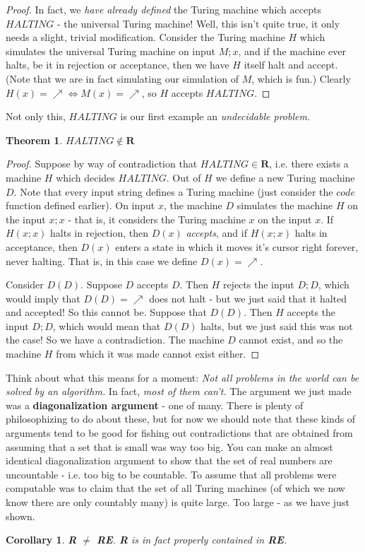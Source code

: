 \documentclass{article}
\theoremstyle{definition}
\theoremstyle{plain}
\theoremstyle{theorem}
\newtheorem{theorem}{Theorem}[section]
\newtheorem{corollary}{Corollary}[section]
\begin{document}
\begin{proof}
    In fact, we \textit{have already defined } the Turing machine which accepts $HALTING$ - the universal Turing machine! Well, this isn't quite true, it only needs a slight, trivial modification. Consider the Turing machine $H$ which simulates the universal Turing machine on input $M;x$, and if the machine ever halts, be it in rejection or acceptance, then we have $H$ itself halt and accept. (Note that we are in fact simulating our simulation of $M$, which is fun.) Clearly $H(x) = \nearrow \iff M(x) = \nearrow$, so $H$ accepts $HALTING$.
\end{proof}
Not only this, $HALTING$ is our first example an \textit{undecidable problem}. 
\begin{theorem}
    $HALTING \notin \textbf{R}$
\end{theorem}
\begin{proof}
    Suppose by way of contradiction that $HALTING \in \textbf{R}$, i.e. there exists a machine $H$ which decides $HALTING$. Out of $H$ we define a new Turing machine $D$. Note that every input string defines a Turing machine (just consider the $code$ function defined earlier). On input $x$, the machine $D$ simulates the machine $H$ on the input $x;x$ - that is, it considers the Turing machine $x$ on the input $x$. If $H(x;x)$ halts in rejection, then $D(x)$ \textit{accepts}, and if $H(x;x)$ halts in acceptance, then $D(x)$ enters a state in which it moves it's cursor right forever, never halting. That is, in this case we define $D(x) = \nearrow$.
    \par Consider $D(D)$. Suppose $D$ accepts $D$. Then $H$ rejects the input $D;D$, which would imply that $D(D) = \nearrow$ does not halt - but we just said that it halted and accepted! So this cannot be. Suppose that $D(D)$. Then $H$ accepts the input $D;D$, which would mean that $D(D)$ halts, but we just said this was not the case! So we have a contradiction. The machine $D$ cannot exist, and so the machine $H$ from which it was made cannot exist either.
\end{proof}
Think about what this means for a moment: \textit{Not all problems in the world can be solved by an algorithm.} In fact, \textit{most of them can't.} The argument we just made was a \textbf{diagonalization argument} - one of many. There is plenty of philosophizing to do about these, but for now we should note that these kinds of arguments tend to be good for fishing out contradictions that are obtained from assuming that a set that is small was way too big. You can make an almost identical diagonalization argument to show that the set of real numbers are uncountable - i.e. too big to be countable. To assume that all problems were computable was to claim that the set of all Turing machines (of which we now know there are only countably many) is quite large. Too large - as we have just shown.
\begin{corollary}
     \textbf{R} $\neq$ \textbf{RE}. \textbf{R} is in fact properly contained in \textbf{RE}.
\end{corollary}
\end{document}
